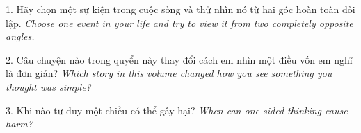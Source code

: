 \begin{tcolorbox}[colback=truyengold!10,colframe=truyengold!70!black,coltitle=black,fonttitle=\bfseries,title={Tự Học Nhanh},arc=4pt,boxrule=1pt,breakable]
1. Hãy chọn một sự kiện trong cuộc sống và thử nhìn nó từ hai góc hoàn toàn đối lập. \textit{Choose one event in your life and try to view it from two completely opposite angles.}

2. Câu chuyện nào trong quyển này thay đổi cách em nhìn một điều vốn em nghĩ là đơn giản? \textit{Which story in this volume changed how you see something you thought was simple?}

3. Khi nào tư duy một chiều có thể gây hại? \textit{When can one-sided thinking cause harm?}
\end{tcolorbox}

\ngancach
